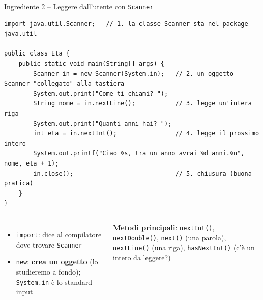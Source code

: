 \documentclass[10pt,aspectratio=169]{beamer}
\begin{document}
\begin{frame}[fragile]{Ingrediente 2 -- Leggere dall'utente con \texttt{Scanner}}
\begin{lstlisting}
import java.util.Scanner;   // 1. la classe Scanner sta nel package java.util

public class Eta {
    public static void main(String[] args) {
        Scanner in = new Scanner(System.in);   // 2. un oggetto Scanner "collegato" alla tastiera
        System.out.print("Come ti chiami? ");
        String nome = in.nextLine();           // 3. legge un'intera riga
        System.out.print("Quanti anni hai? ");
        int eta = in.nextInt();                // 4. legge il prossimo intero
        System.out.printf("Ciao %s, tra un anno avrai %d anni.%n", nome, eta + 1);
        in.close();                            // 5. chiusura (buona pratica)
    }
}
\end{lstlisting}

\begin{columns}[T]
\small
\begin{itemize}\itemsep=0pt
    \item \texttt{import}: dice al compilatore dove trovare \texttt{Scanner}
    \item \texttt{new}: \textbf{crea un oggetto} (lo studieremo a fondo); \texttt{System.in} è lo standard input
\end{itemize}
\small
\textbf{Metodi principali}: \texttt{nextInt()}, \texttt{nextDouble()}, \texttt{next()} (una parola), \texttt{nextLine()} (una riga), \texttt{hasNextInt()} (c'è un intero da leggere?)
\end{columns}
\end{frame}
\end{document}
